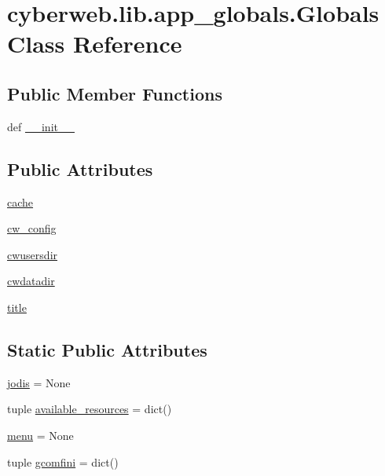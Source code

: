 \hypertarget{classcyberweb_1_1lib_1_1app__globals_1_1_globals}{\section{cyberweb.\-lib.\-app\-\_\-globals.\-Globals \-Class \-Reference}
\label{classcyberweb_1_1lib_1_1app__globals_1_1_globals}
}
\subsection*{\-Public \-Member \-Functions}
\begin{DoxyCompactItemize}
\item 
def \hyperlink{classcyberweb_1_1lib_1_1app__globals_1_1_globals_a3f05e200afc654e414e05f4a51ffa4a4}{\-\_\-\-\_\-init\-\_\-\-\_\-}
\end{DoxyCompactItemize}
\subsection*{\-Public \-Attributes}
\begin{DoxyCompactItemize}
\item 
\hyperlink{classcyberweb_1_1lib_1_1app__globals_1_1_globals_a8dd06e4e31ccfb110879ec19935e3c2e}{cache}
\item 
\hyperlink{classcyberweb_1_1lib_1_1app__globals_1_1_globals_a118e8cd83580b9ab84c43efa5c34f0a4}{cw\-\_\-config}
\item 
\hyperlink{classcyberweb_1_1lib_1_1app__globals_1_1_globals_a8d86d0aa2dbc5347ae818518dd172abd}{cwusersdir}
\item 
\hyperlink{classcyberweb_1_1lib_1_1app__globals_1_1_globals_a214165b70fcd2105a203560e82f71854}{cwdatadir}
\item 
\hyperlink{classcyberweb_1_1lib_1_1app__globals_1_1_globals_a11fa9c51207f4a8255148e69debd5314}{title}
\end{DoxyCompactItemize}
\subsection*{\-Static \-Public \-Attributes}
\begin{DoxyCompactItemize}
\item 
\hyperlink{classcyberweb_1_1lib_1_1app__globals_1_1_globals_a176491cb8310eeaeb5489c1fc0254531}{jodis} = \-None
\item 
tuple \hyperlink{classcyberweb_1_1lib_1_1app__globals_1_1_globals_a8646f7520310cfd3e49dc9cf46c700e5}{available\-\_\-resources} = dict()
\item 
\hyperlink{classcyberweb_1_1lib_1_1app__globals_1_1_globals_ab9867be11a213f206278744d02509671}{menu} = \-None
\item 
tuple \hyperlink{classcyberweb_1_1lib_1_1app__globals_1_1_globals_ae2f860724b22f245a020f7bb66504640}{gcomfini} = dict()
\end{DoxyCompactItemize}


